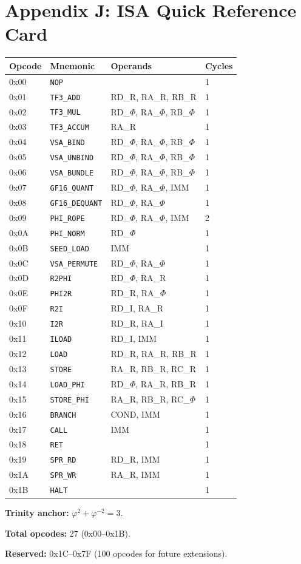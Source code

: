 \section{Appendix J: ISA Quick Reference Card}\label{fa_71:appx-quickref}

\begin{longtable}[]{@{}llll@{}}
\toprule\noalign{}
Opcode & Mnemonic & Operands & Cycles \\
\midrule\noalign{}
\endhead
\bottomrule\noalign{}
\endlastfoot
0x00 & \texttt{NOP} & & 1 \\
0x01 & \texttt{TF3\_ADD} & RD\_R, RA\_R, RB\_R & 1 \\
0x02 & \texttt{TF3\_MUL} & RD\_$\Phi$, RA\_$\Phi$, RB\_$\Phi$ & 1 \\
0x03 & \texttt{TF3\_ACCUM} & RA\_R & 1 \\
0x04 & \texttt{VSA\_BIND} & RD\_$\Phi$, RA\_$\Phi$, RB\_$\Phi$ & 1 \\
0x05 & \texttt{VSA\_UNBIND} & RD\_$\Phi$, RA\_$\Phi$, RB\_$\Phi$ & 1 \\
0x06 & \texttt{VSA\_BUNDLE} & RD\_$\Phi$, RA\_$\Phi$, RB\_$\Phi$ & 1 \\
0x07 & \texttt{GF16\_QUANT} & RD\_$\Phi$, RA\_$\Phi$, IMM & 1 \\
0x08 & \texttt{GF16\_DEQUANT} & RD\_$\Phi$, RA\_$\Phi$ & 1 \\
0x09 & \texttt{PHI\_ROPE} & RD\_$\Phi$, RA\_$\Phi$, IMM & 2 \\
0x0A & \texttt{PHI\_NORM} & RD\_$\Phi$ & 1 \\
0x0B & \texttt{SEED\_LOAD} & IMM & 1 \\
0x0C & \texttt{VSA\_PERMUTE} & RD\_$\Phi$, RA\_$\Phi$ & 1 \\
0x0D & \texttt{R2PHI} & RD\_$\Phi$, RA\_R & 1 \\
0x0E & \texttt{PHI2R} & RD\_R, RA\_$\Phi$ & 1 \\
0x0F & \texttt{R2I} & RD\_I, RA\_R & 1 \\
0x10 & \texttt{I2R} & RD\_R, RA\_I & 1 \\
0x11 & \texttt{ILOAD} & RD\_I, IMM & 1 \\
0x12 & \texttt{LOAD} & RD\_R, RA\_R, RB\_R & 1 \\
0x13 & \texttt{STORE} & RA\_R, RB\_R, RC\_R & 1 \\
0x14 & \texttt{LOAD\_PHI} & RD\_$\Phi$, RA\_R, RB\_R & 1 \\
0x15 & \texttt{STORE\_PHI} & RA\_R, RB\_R, RC\_$\Phi$ & 1 \\
0x16 & \texttt{BRANCH} & COND, IMM & 1 \\
0x17 & \texttt{CALL} & IMM & 1 \\
0x18 & \texttt{RET} & & 1 \\
0x19 & \texttt{SPR\_RD} & RD\_R, IMM & 1 \\
0x1A & \texttt{SPR\_WR} & RA\_R, IMM & 1 \\
0x1B & \texttt{HALT} & & 1 \\
\end{longtable}

\textbf{Trinity anchor:} \(\varphi^2 + \varphi^{-2} = 3\).

\textbf{Total opcodes:} 27 (0x00--0x1B).

\textbf{Reserved:} 0x1C--0x7F (100 opcodes for future extensions).
